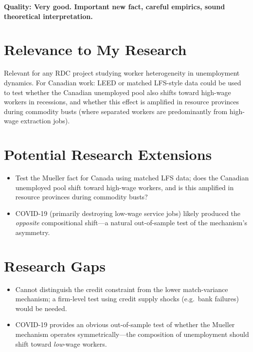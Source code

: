 \textbf{Quality: Very good. Important new fact, careful empirics, sound
theoretical interpretation.}

\section{Relevance to My Research}

Relevant for any RDC project studying worker heterogeneity in unemployment
dynamics. For Canadian work: LEED or matched LFS-style data could be used to
test whether the Canadian unemployed pool also shifts toward high-wage workers
in recessions, and whether this effect is amplified in resource provinces
during commodity busts (where separated workers are predominantly from
high-wage extraction jobs).

\section{Potential Research Extensions}

\begin{itemize}
  \item Test the Mueller fact for Canada using matched LFS data; does the
    Canadian unemployed pool shift toward high-wage workers, and is this
    amplified in resource provinces during commodity busts?
  \item COVID-19 (primarily destroying low-wage service jobs) likely produced
    the \emph{opposite} compositional shift---a natural out-of-sample test
    of the mechanism's asymmetry.
\end{itemize}

\section{Research Gaps}

\begin{itemize}
  \item Cannot distinguish the credit constraint from the lower match-variance
    mechanism; a firm-level test using credit supply shocks (e.g.\ bank
    failures) would be needed.
  \item COVID-19 provides an obvious out-of-sample test of whether the
    Mueller mechanism operates symmetrically---the composition of unemployment
    should shift toward \emph{low}-wage workers.
\end{itemize}

